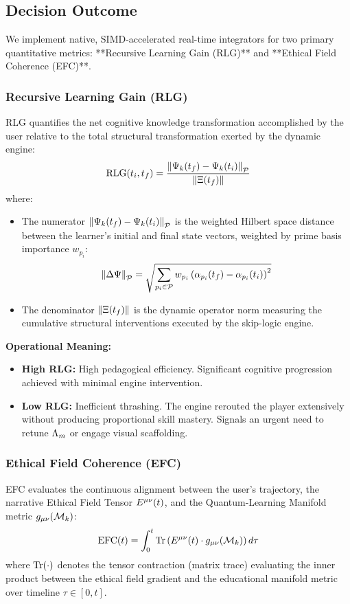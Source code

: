 \subsection{Decision Outcome}
We implement native, SIMD-accelerated real-time integrators for two primary quantitative metrics: **Recursive Learning Gain (RLG)** and **Ethical Field Coherence (EFC)**.

\subsubsection{Recursive Learning Gain (RLG)}
RLG quantifies the net cognitive knowledge transformation accomplished by the user relative to the total structural transformation exerted by the dynamic engine:
\begin{equation}
\label{eq:rlg}
\mathrm{RLG}(t_i, t_f) = \frac{\norm{\Psi_k(t_f) - \Psi_k(t_i)}_{\mathcal{P}}}{\norm{\Xi(t_f)}}
\end{equation}
where:
\begin{itemize}
    \item The numerator $\norm{\Psi_k(t_f) - \Psi_k(t_i)}_{\mathcal{P}}$ is the weighted Hilbert space distance between the learner's initial and final state vectors, weighted by prime basis importance $w_{p_i}$:
    \begin{equation}
    \norm{\Delta \Psi}_{\mathcal{P}} = \sqrt{\sum_{p_i \in \mathcal{P}} w_{p_i} \left(\alpha_{p_i}(t_f) - \alpha_{p_i}(t_i)\right)^2}
    \end{equation}
    \item The denominator $\norm{\Xi(t_f)}$ is the dynamic operator norm measuring the cumulative structural interventions executed by the skip-logic engine.
\end{itemize}

\textbf{Operational Meaning:}
\begin{itemize}
    \item \textbf{High RLG:} High pedagogical efficiency. Significant cognitive progression achieved with minimal engine intervention.
    \item \textbf{Low RLG:} Inefficient thrashing. The engine rerouted the player extensively without producing proportional skill mastery. Signals an urgent need to retune $\Lambda_m$ or engage visual scaffolding.
\end{itemize}

\subsubsection{Ethical Field Coherence (EFC)}
EFC evaluates the continuous alignment between the user's trajectory, the narrative Ethical Field Tensor $E^{\mu\nu}(t)$, and the Quantum-Learning Manifold metric $g_{\mu\nu}(\mathcal{M}_k)$:
\begin{equation}
\label{eq:efc}
\mathrm{EFC}(t) = \int_{0}^t \Tr\left(E^{\mu\nu}(t) \cdot g_{\mu\nu}(\mathcal{M}_k)\right) d\tau
\end{equation}
where $\Tr(\cdot)$ denotes the tensor contraction (matrix trace) evaluating the inner product between the ethical field gradient and the educational manifold metric over timeline $\tau \in [0, t]$.

